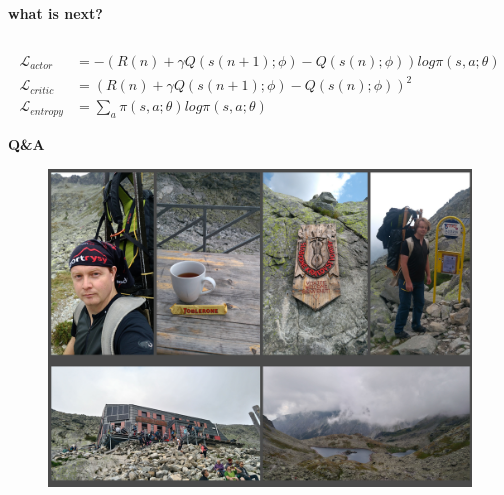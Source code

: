 \documentclass[xcolor=dvipsnames]{beamer}
\begin{document}
\begin{frame}{\bf what is next?}
\begin{columns}
\begin{column}{0.7\textwidth}
  \end{column}

\end{columns}


\begin{align*}
\mathcal{L}_{actor}&= -\left( R(n) + \gamma Q(s(n+1); \phi) - Q(s(n); \phi)  \right) log \pi(s, a; \theta) \\
\mathcal{L}_{critic}&= \left( R(n) + \gamma Q(s(n+1); \phi) - Q(s(n); \phi)  \right)^2 \\
\mathcal{L}_{entropy}&= \sum_a \pi(s, a; \theta) log \pi(s, a; \theta)
\end{align*}


\end{frame}



\begin{frame}{\bf Q\&A}

\begin{figure}
  \includegraphics[scale=0.4]{../images/me_rysy.jpg}
\end{figure}



\end{frame}
\end{document}
